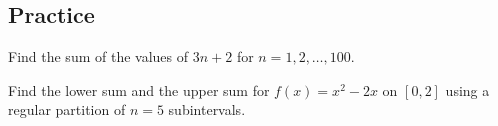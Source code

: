 








\subsection{Practice}

\begin{exercise}

Find the sum of the values of \(3n+2\) for \(n=1,2, \dots ,100\).

\end{exercise}
\vspace*{6\baselineskip}

\begin{exercise}

Find the lower sum and the upper sum for \(f(x)=x^2-2x\) on \([0,2]\)
using a regular partition of \(n=5\) subintervals.

\end{exercise}
\vspace*{6\baselineskip}







